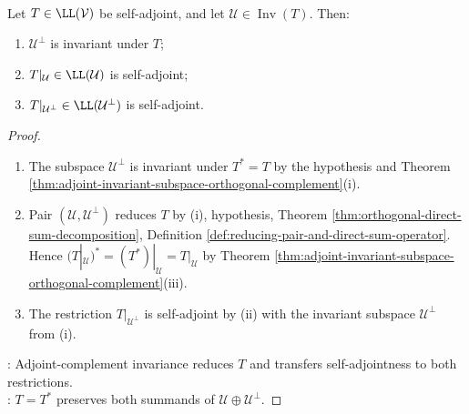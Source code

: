 \begin{proposition} \label{prop:self-adjoint-invariant-subspaces} \\
Let $T\in\LL(\mathcal{V})$ be self-adjoint, and let $\mathcal{U}\in\operatorname{Inv}(T)$. Then:
\begin{enumerate}[label=(\roman*)]
\setlength{\itemsep}{0pt}
\item $\mathcal{U}^{\perp}$ is invariant under $T$;
\item $T|_{\mathcal{U}}\in\LL(\mathcal{U})$ is self-adjoint;
\item $T|_{\mathcal{U}^{\perp}}\in\LL(\mathcal{U}^{\perp})$ is self-adjoint.
\end{enumerate}
\begin{proof}
\begin{enumerate}[label=(\roman*)]
\setlength{\itemsep}{0pt}
\item The subspace $\mathcal{U}^{\perp}$ is invariant under $T^*=T$ by the hypothesis and Theorem \ref{thm:adjoint-invariant-subspace-orthogonal-complement}(i).
\item Pair $(\mathcal{U},\mathcal{U}^{\perp})$ reduces $T$ by (i), hypothesis, Theorem \ref{thm:orthogonal-direct-sum-decomposition}, Definition \ref{def:reducing-pair-and-direct-sum-operator}. Hence $(T|_{\mathcal{U}})^*=(T^*)|_{\mathcal{U}}=T|_{\mathcal{U}}$ by Theorem \ref{thm:adjoint-invariant-subspace-orthogonal-complement}(iii).
\item The restriction $T|_{\mathcal{U}^{\perp}}$ is self-adjoint by (ii) with the invariant subspace $\mathcal{U}^{\perp}$ from (i).
\end{enumerate}
: Adjoint-complement invariance reduces $T$ and transfers self-adjointness to both restrictions.\\
: $T=T^*$ preserves both summands of $\mathcal{U}\oplus\mathcal{U}^{\perp}$.
\end{proof}
\end{proposition}

